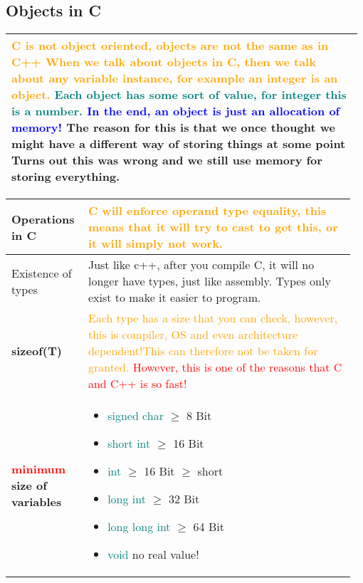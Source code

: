 \documentclass[main.tex,fontsize=8pt,paper=a4,paper=portrait,DIV=calc,]{scrartcl}
\begin{document}
\begin{table}[ht!]
\subsection{Objects in C}
\begin{tabular}{|m{0.977\linewidth}|}
\hline
\textcolor{orange}{\textbf{C is not object oriented, objects are not the same as in C++}\newline
When we talk about objects in C, then we talk about any variable instance, for example an integer is an object.}\newline
\textcolor{teal}{Each object has some sort of value, for integer this is a number.}\newline
\textcolor{blue}{\textbf{In the end, an object is just an allocation of memory!}}\newline
The reason for this is that we once thought we might have a different way of storing things at some point\newline
Turns out this was wrong and we still use memory for storing everything.\\
\hline
\end{tabular}
\begin{tabular}{|m{0.2\linewidth}|m{0.755\linewidth}|}
\hline
Operations in C & 
\textcolor{orange}{C will enforce operand type equality, this means that it will try to cast to get this,\newline
or it will simply not work.}\\
\hline
Existence of types & 
Just like c++, after you compile C, it will no longer have types, just like assembly.\newline
Types only exist to make it easier to program.\\
\hline
\textbf{sizeof(T)}&
\textcolor{orange}{Each type has a size that you can check, however, this is compiler, OS and even architecture dependent!\newline This can therefore not be taken for granted.}\newline
\textcolor{red}{However, this is one of the reasons that C and C++ is so fast!}\\
\hline
\textbf{\textcolor{red}{minimum} size of variables}&
\vspace{2mm}
\begin{itemize}
  \item \textcolor{teal}{signed char} \(\geq\) 8 Bit
  \item \textcolor{teal}{short int} \(\geq\) 16 Bit
  \item \textcolor{teal}{int} \(\geq\) 16 Bit \(\geq\) short
  \item \textcolor{teal}{long int} \(\geq\) 32 Bit
  \item \textcolor{teal}{long long int} \(\geq\) 64 Bit
  \item \textcolor{teal}{void} no real value!
  \vspace{-3mm}
\end{itemize}\\
\hline
\end{tabular}
\end{table}
\end{document}
